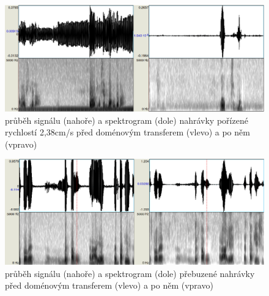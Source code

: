 \begin{figure}[htpb]
\includegraphics[scale=0.4]{rc/gan-plzen.eps}
\caption{průběh signálu (nahoře) a spektrogram (dole) nahrávky pořízené
rychlostí 2,38cm/s před doménovým transferem (vlevo) a po něm (vpravo)}
\label{fig:plzen}
\end{figure}

\begin{figure}[htpb]
\includegraphics[scale=0.4]{rc/gan-overdrive.eps}
\caption{průběh signálu (nahoře) a spektrogram (dole) přebuzené nahrávky
před doménovým transferem (vlevo) a po něm (vpravo)}
\label{fig:overdrive}
\end{figure}
